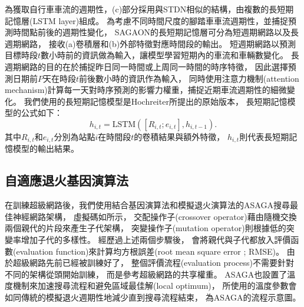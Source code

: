 \documentclass[a4paper,12pt]{extarticle}
\begin{document}
            為獲取自行車車流的週期性，(c)部分採用與STDN相似的結構，由複數的長短期記憶層(LSTM layer)組成。
            為考慮不同時間尺度的腳踏車車流週期性，並捕捉預測時間點前後的週期性變化，
            SAGAON的長短期記憶層可分為短週期網路以及長週期網路，
            接收(a)卷積層和(b)外部特徵對應時間段的輸出。
            短週期網路以預測目標時段$t$數小時前的資訊做為輸入，讓模型學習短期內的車流和車輛數變化。
            長週期網路的目的在於捕捉昨日同一時間或上周同一時間的時序特徵，
            因此選擇預測日期前$P$天在時段$t$前後數小時的資訊作為輸入，
            同時使用注意力機制(attention mechanism)計算每一天對時序預測的影響力權重，捕捉近期車流週期性的細微變化。
            我們使用的長短期記憶模型是Hochreiter\cite{10.1162/neco.1997.9.8.1735}所提出的原始版本，
            長短期記憶模型的公式如下：
            \begin{equation}
                h_{i,t} = \text{LSTM}([R_{i,t};e_{i,t}],h_{i,t-1}).
            \end{equation}
            其中$R_{i,t}$和$e_{i,t}$分別為站點$i$在時間段$t$的卷積結果與額外特徵，
            $h_{i,t}$則代表長短期記憶模型的輸出結果。

        \subsection{自適應退火基因演算法}

            在訓練超級網路後，我們使用結合基因演算法和模擬退火演算法的ASAGA搜尋最佳神經網路架構，
            虛擬碼如所示，
            交配操作子(crossover operator)藉由隨機交換兩個親代的片段來產生子代架構，
            突變操作子(mutation operator)則根據低的突變率增加子代的多樣性。
            經歷過上述兩個步驟後，
            會將親代與子代都放入評價函數(evaluation function)來計算均方根誤差(root mean square error ; RMSE)。
            由於超級網路先前已經被訓練好了，
            整個評價流程(evaluation process)不需要針對不同的架構從頭開始訓練，
            而是參考超級網路的共享權重。
            ASAGA也設置了溫度機制來加速搜尋流程和避免區域最佳解(local optimum)，
            所使用的溫度參數會如同傳統的模擬退火週期性地減少直到搜尋流程結束，
            為ASAGA的流程示意圖。

            \renewcommand{\algorithmicrequire}{\textbf{Input:}}  %
            \renewcommand{\algorithmicensure}{\textbf{Output:}} %
\end{document}
